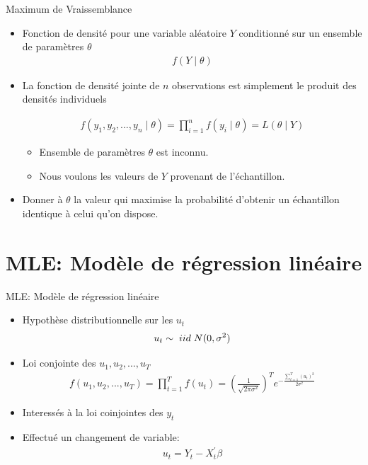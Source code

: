 \documentclass{beamer}
\begin{document}
\begin{frame}{Maximum de Vraissemblance}
\begin{itemize}
\item Fonction de densité pour une variable aléatoire $Y$ conditionné sur un ensemble de paramètres $\theta$
\begin{align*}
f(Y \mid \theta)
\end{align*}
\item La fonction de densité jointe de $n$ observations est simplement le produit des densités individuels 

\begin{align*}
f(y_1,y_2,...,y_n \mid \theta)=\prod_{i=1}^{n} f(y_i \mid \theta)=L(\theta \mid Y)
\end{align*}
\begin{itemize}
\item Ensemble de paramètres $\theta$ est inconnu.
\item Nous voulons les valeurs de $Y$ provenant de l'échantillon.
\end{itemize}
\item Donner à $\theta$ la valeur qui maximise la probabilité d'obtenir un échantillon identique à celui qu'on dispose.
\end{itemize}
\end{frame}

\section{MLE: Modèle de régression linéaire}

\frame{\tableofcontents[current]}


\begin{frame}{MLE: Modèle de régression linéaire}
\begin{itemize}
\item Hypothèse distributionnelle sur les $u_t$
\begin{align*}
u_t \sim \hspace{0.1cm} iid \hspace{0.1cm} N(0,\sigma^2)
\end{align*}
\item Loi conjointe des $u_1, u_2, ..., u_T$
\begin{align*}
f(u_1,u_2,...,u_T)=\prod_{t=1}^{T}f(u_t)=\left(\frac{1}{\sqrt{2 \pi \sigma^2}}\right)^T e^{-\frac{\sum_{t=1}^T(u_t)^2}{2 \sigma^2}}
\end{align*}
\item Interessés à la loi coinjointes des $y_t$
\item Effectué un changement de variable: 
\begin{align*}
u_t=Y_t-X_t^{'} \beta
\end{align*}
\end{itemize}
\end{frame}
\end{document}
